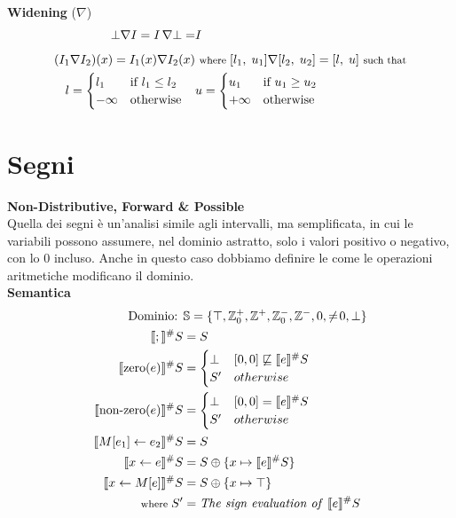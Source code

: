 \documentclass[a4paper,12pt,openany]{article}
\begin{document}
    \textbf{Widening} ($\nabla$)
    \begin{align*}
        \bot\nabla I = I\,\nabla\bot = &I\\[0.5em]
        (I_1 \nabla I_2)(x) = I_1(x)\nabla I_2(x) &\mbox{ \footnotesize where } [l_1,\;u_1]\nabla[l_2,\;u_2] = [l,\;u] \mbox{ \footnotesize such that}\\
        l =
        \begin{cases}
            l_1 & \mbox{if } l_1 \leq l_2\\
            -\infty & \mbox{otherwise}
        \end{cases}
        \quad &u =
        \begin{cases}
            u_1 & \mbox{if } u_1 \geq u_2\\
            +\infty & \mbox{otherwise}
        \end{cases}
    \end{align*}



    \clearpage\section*{Segni}
    \textbf{Non-Distributive, Forward \& Possible}\\[1em]
    Quella dei segni è un'analisi simile agli intervalli, ma semplificata, in cui le variabili possono assumere, nel dominio astratto, solo i valori positivo o negativo, con lo 0 incluso. Anche in questo caso dobbiamo definire le come le operazioni aritmetiche modificano il dominio.\\[1em]
    
    \textbf{Semantica}
    \begin{align*}
    \mbox{Dominio: }& \mathbb{S}=\{ \top, \mathbb{Z}_0^+, \mathbb{Z}^+, \mathbb{Z}_0^-, \mathbb{Z}^-, 0, \neq\!0, \bot \}\\
    \llbracket ; \rrbracket^\#S &= S\\
    \llbracket \mbox{zero}(e) \rrbracket^\#S &= 
    \begin{cases}
    \bot & [0, 0] \not\sqsubseteq \llbracket e \rrbracket^\#S\\
    S' & otherwise
    \end{cases}\\
    \llbracket \mbox{non-zero}(e) \rrbracket^\#S &= 
    \begin{cases}
    \bot & [0, 0] = \llbracket e \rrbracket^\#S\\
    S' & otherwise
    \end{cases}\\
    \llbracket M[e_1]\leftarrow e_2 \rrbracket^\#S &= S\\
    \llbracket x \leftarrow e \rrbracket^\#S &= S\oplus \{x\mapsto\llbracket e \rrbracket^\#S\}\\
    \llbracket x \leftarrow M[e] \rrbracket^\#S &= S\oplus \{x\mapsto\top\}\\
    \mbox{\footnotesize where } S' &= \mbox{\textit{The sign evaluation of} } \llbracket e \rrbracket^\#S
    \end{align*}
\end{document}
